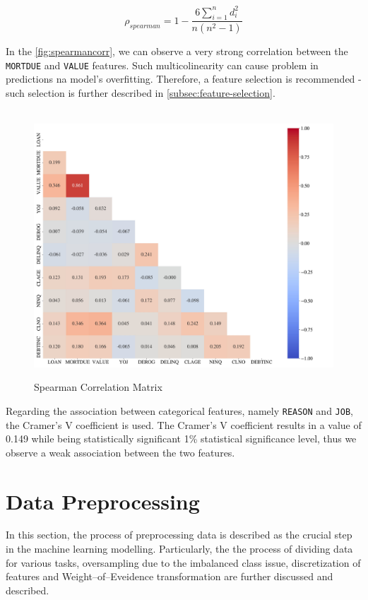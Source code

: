\begin{equation}\label{eq}
\rho_{spearman} = 1 - \frac{6 \sum_{i=1}^{n} d_{i}^{2}}{n \left(n^{2}-1\right)}
\end{equation}


In the \autoref{fig:spearmancorr}, we can observe a very strong correlation between the \texttt{MORTDUE} and \texttt{VALUE} features. Such multicolinearity can cause problem in predictions na model's overfitting. Therefore, a feature selection is recommended - such selection is further described in \autoref{subsec:feature-selection}.

\begin{figure}[H]
    \centering
    \caption{Spearman Correlation Matrix}\vspace{0.5em}
    \label{fig:spearmancorr}\
    \includegraphics[width=150mm]{Figures/Spearman_Correlation_Matrix_Numeric_Features.jpg}
    \centering{\begin{source}Author's results in Python\end{source}}\vspace{-1em}
\end{figure}

Regarding the association between categorical features, namely \texttt{REASON} and \texttt{JOB}, the Cramer's V coefficient is used. The Cramer's V coefficient results in a value of 0.149 while being statistically significant 1\% statistical significance level, thus we observe a weak association between the two features.

\newpage
\section{Data Preprocessing}
In this section, the process of preprocessing data is described as the crucial step in the machine learning modelling. Particularly, the the process of dividing data for various tasks, oversampling due to the imbalanced class issue, discretization of features and Weight--of--Eveidence transformation are further discussed and described.

